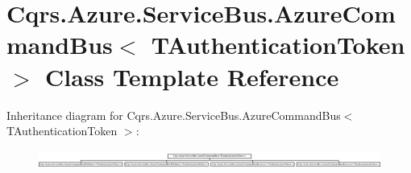\hypertarget{classCqrs_1_1Azure_1_1ServiceBus_1_1AzureCommandBus}{}\section{Cqrs.\+Azure.\+Service\+Bus.\+Azure\+Command\+Bus$<$ T\+Authentication\+Token $>$ Class Template Reference}
\label{classCqrs_1_1Azure_1_1ServiceBus_1_1AzureCommandBus}
Inheritance diagram for Cqrs.\+Azure.\+Service\+Bus.\+Azure\+Command\+Bus$<$ T\+Authentication\+Token $>$\+:\begin{figure}[H]
\begin{center}
\leavevmode
\includegraphics[height=0.602151cm]{classCqrs_1_1Azure_1_1ServiceBus_1_1AzureCommandBus}
\end{center}
\end{figure}
